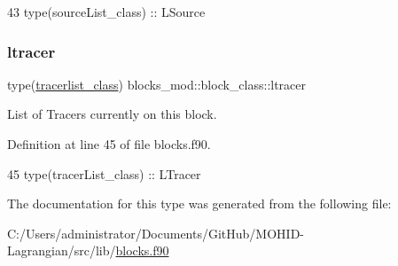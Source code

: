 \begin{DoxyCode}
43         \textcolor{keywordtype}{type}(sourceList\_class) :: LSource
\end{DoxyCode}
\mbox{\label{structblocks__mod_1_1block__class_ab4e2108886a09ba919d01474503f6165}} 
\subsubsection{\texorpdfstring{ltracer}{ltracer}}
{\footnotesize\ttfamily type(\mbox{\hyperlink{structtracer__list__mod_1_1tracerlist__class}{tracerlist\+\_\+class}}) blocks\+\_\+mod\+::block\+\_\+class\+::ltracer\hspace{0.3cm}{\ttfamily [private]}}



List of Tracers currently on this block. 



Definition at line 45 of file blocks.\+f90.


\begin{DoxyCode}
45         \textcolor{keywordtype}{type}(tracerList\_class) :: LTracer
\end{DoxyCode}


The documentation for this type was generated from the following file\+:\begin{DoxyCompactItemize}
\item 
C\+:/\+Users/administrator/\+Documents/\+Git\+Hub/\+M\+O\+H\+I\+D-\/\+Lagrangian/src/lib/\mbox{\hyperlink{blocks_8f90}{blocks.\+f90}}\end{DoxyCompactItemize}
